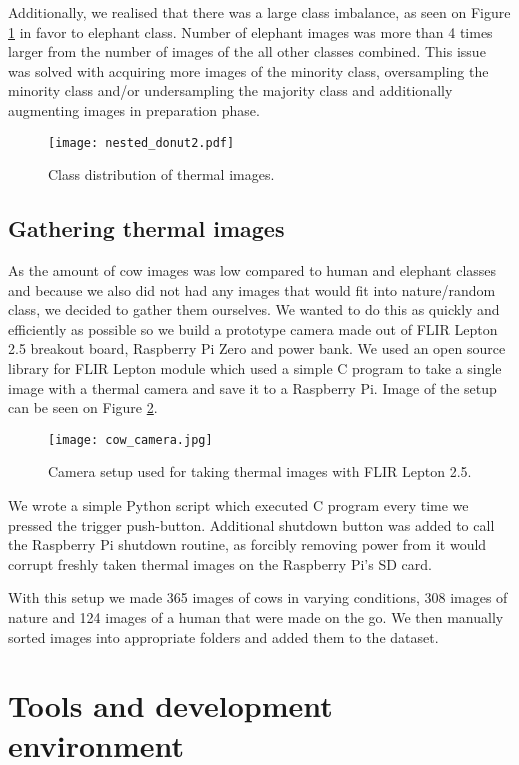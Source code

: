 Additionally, we realised that there was a large class imbalance, as seen on Figure \ref{nested_donut2} in favor to elephant class.
Number of elephant images was more than 4 times larger from the number of images of the all other classes combined.
This issue was solved with acquiring more images of the minority class, oversampling the minority class and/or undersampling the majority class and additionally augmenting images in preparation phase.

\begin{figure}[ht]
    \centering
    \texttt{[image: nested\_donut2.pdf]} 
    \caption{Class distribution of thermal images.}
    \label{nested_donut2}
\end{figure}

\subsection{ Gathering thermal images}

As the amount of cow images was low compared to human and elephant classes and because we also did not had any images that would fit into nature/random class, we decided to gather them ourselves.
We wanted to do this as quickly and efficiently as possible so we build a prototype camera made out of FLIR Lepton 2.5 breakout board, Raspberry Pi Zero and power bank.
We used an open source library \cite{flir_github} for FLIR Lepton module which used a simple C program to take a single image with a thermal camera and save it to a Raspberry Pi.
Image of the setup can be seen on Figure \ref{cow_camera}.

\begin{figure}[ht]
    \centering
    \texttt{[image: cow\_camera.jpg]} 
    \caption{Camera setup used for taking thermal images with FLIR Lepton 2.5.}
    \label{cow_camera}
\end{figure}

We wrote a simple Python script which executed C program every time we pressed the trigger push-button.
Additional shutdown button was added to call the Raspberry Pi shutdown routine, as forcibly removing power from it would corrupt freshly taken thermal images on the Raspberry Pi's SD card.

With this setup we made 365 images of cows in varying conditions, 308 images of nature and 124 images of a human that were made on the go.
We then manually sorted images into appropriate folders and added them to the dataset.


\section{ Tools and development environment}

